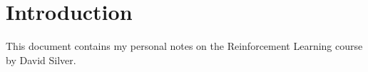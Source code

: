 \section{Introduction}

This document contains my personal notes on the Reinforcement Learning course
by David Silver.
